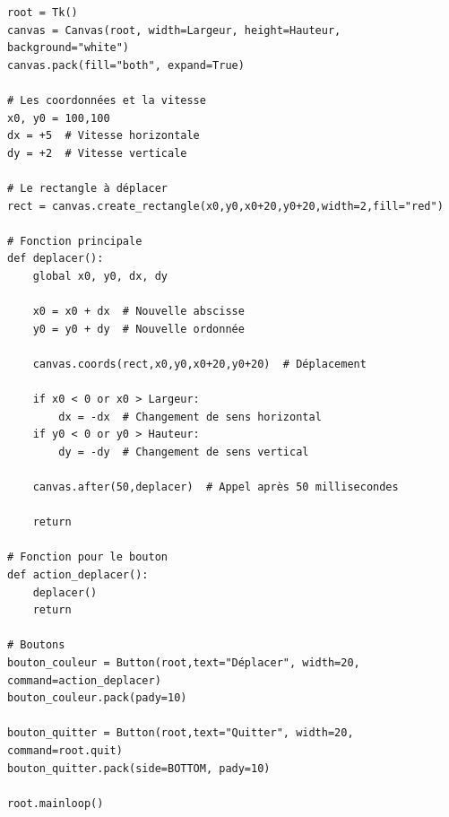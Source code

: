 \documentclass[11pt,class=report,crop=false]{standalone}
\begin{document}
\begin{cours}
\begin{lstlisting}
root = Tk()     
canvas = Canvas(root, width=Largeur, height=Hauteur, background="white")
canvas.pack(fill="both", expand=True)

# Les coordonnées et la vitesse
x0, y0 = 100,100
dx = +5  # Vitesse horizontale
dy = +2  # Vitesse verticale

# Le rectangle à déplacer
rect = canvas.create_rectangle(x0,y0,x0+20,y0+20,width=2,fill="red")

# Fonction principale
def deplacer():
    global x0, y0, dx, dy

    x0 = x0 + dx  # Nouvelle abscisse
    y0 = y0 + dy  # Nouvelle ordonnée

    canvas.coords(rect,x0,y0,x0+20,y0+20)  # Déplacement

    if x0 < 0 or x0 > Largeur:
        dx = -dx  # Changement de sens horizontal
    if y0 < 0 or y0 > Hauteur:
        dy = -dy  # Changement de sens vertical

    canvas.after(50,deplacer)  # Appel après 50 millisecondes
 
    return
    
# Fonction pour le bouton
def action_deplacer():
    deplacer()
    return

# Boutons
bouton_couleur = Button(root,text="Déplacer", width=20, command=action_deplacer)
bouton_couleur.pack(pady=10)

bouton_quitter = Button(root,text="Quitter", width=20, command=root.quit)
bouton_quitter.pack(side=BOTTOM, pady=10)

root.mainloop()
\end{lstlisting}

\end{cours}
\end{document}

